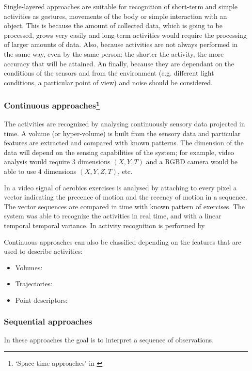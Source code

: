 \documentclass[a4paper, 12pt, openany, oneside]{book}
\begin{document}
Single-layered approaches are suitable for recognition of short-term and simple activities as gestures, movements of the body or simple interaction with an object. 
This is because the amount of collected data, which is going to be processed, grows very easily and long-term activities would require the processing of larger amounts of data. 
Also, because activities are not always performed in the same way, even by the same person; the shorter the activity, the more accuracy that will be attained.  
An finally, because they are dependant on the conditions of the sensors and from the environment (e.g. different light conditions, a particular point of view) and noise should be considered.


\subsubsection{Continuous approaches\footnote{`Space-time approaches' in \citep{Aggarwal11_HumanActivity}}} %
The activities are recognized by analysing continuously sensory data projected in time. 
A volume (or hyper-volume) is built from the sensory data and particular features are extracted and compared with known patterns.
The dimension of the data will depend on the sensing capabilities of the system; for example, video analysis would require 3 dimensions $(X,Y,T)$ and a RGBD camera would be able to use 4 dimensions $(X,Y,Z,T)$, etc. %

In \citep{Bobick2001_RecHuMovTemp} a video signal of aerobics exercises is analysed by attaching to every pixel a vector indicating the precence of motion and the recency of motion in a sequence. The vector sequences are compared in time with known pattern of exercises. The system was able to recognize the activities in real time, and with a linear temporal temporal variance. 
In \citep{Ke2007_SpTmpShapeAR} activity recognition is performed by

Continuous approaches can also be classified depending on the features that are used to describe activities: 
\begin{itemize}
\item Volumes: 
\item Trajectories:
\item Point descriptors:
\end{itemize}




\subsubsection{Sequential approaches} %
In these approaches the goal is to interpret a sequence of observations.
\end{document}
